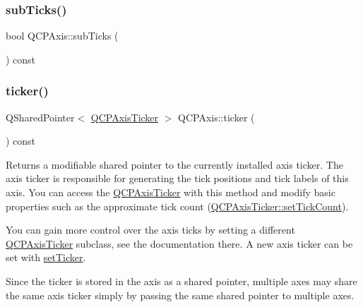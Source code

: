 \mbox{\label{class_q_c_p_axis_ad74153c38fd83b54c509cff249370beb}} 
\subsubsection{\texorpdfstring{sub\+Ticks()}{subTicks()}}
{\footnotesize\ttfamily bool Q\+C\+P\+Axis\+::sub\+Ticks (\begin{DoxyParamCaption}{ }\end{DoxyParamCaption}) const\hspace{0.3cm}{\ttfamily [inline]}}

\mbox{\label{class_q_c_p_axis_a7b7a27151be8235059e1294f73ecf615}} 
\subsubsection{\texorpdfstring{ticker()}{ticker()}}
{\footnotesize\ttfamily Q\+Shared\+Pointer$<$ \hyperlink{class_q_c_p_axis_ticker}{Q\+C\+P\+Axis\+Ticker} $>$ Q\+C\+P\+Axis\+::ticker (\begin{DoxyParamCaption}{ }\end{DoxyParamCaption}) const\hspace{0.3cm}{\ttfamily [inline]}}

Returns a modifiable shared pointer to the currently installed axis ticker. The axis ticker is responsible for generating the tick positions and tick labels of this axis. You can access the \hyperlink{class_q_c_p_axis_ticker}{Q\+C\+P\+Axis\+Ticker} with this method and modify basic properties such as the approximate tick count (\hyperlink{class_q_c_p_axis_ticker_a47752abba8293e6dc18491501ae34008}{Q\+C\+P\+Axis\+Ticker\+::set\+Tick\+Count}).

You can gain more control over the axis ticks by setting a different \hyperlink{class_q_c_p_axis_ticker}{Q\+C\+P\+Axis\+Ticker} subclass, see the documentation there. A new axis ticker can be set with \hyperlink{class_q_c_p_axis_a4ee03fcd2c74d05cd1a419b9af5cfbdc}{set\+Ticker}.

Since the ticker is stored in the axis as a shared pointer, multiple axes may share the same axis ticker simply by passing the same shared pointer to multiple axes.

